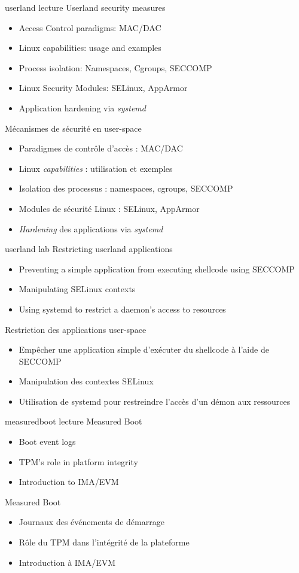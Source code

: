 {userland}
{lecture}
{Userland security measures}
{
  \begin{itemize}
  \item Access Control paradigms: MAC/DAC
  \item Linux capabilities: usage and examples
  \item Process isolation: Namespaces, Cgroups, SECCOMP
  \item Linux Security Modules: SELinux, AppArmor
  \item Application hardening via {\em systemd}
  \end{itemize}
}
{Mécanismes de sécurité en user-space}
{
  \begin{itemize}
  \item Paradigmes de contrôle d’accès : MAC/DAC
  \item Linux {\em capabilities} : utilisation et exemples
  \item Isolation des processus : namespaces, cgroups, SECCOMP
  \item Modules de sécurité Linux : SELinux, AppArmor
  \item {\em Hardening} des applications via {\em systemd}
  \end{itemize}
}

{userland}
{lab}
{Restricting userland applications}
{
  \begin{itemize}
  \item Preventing a simple application from executing shellcode using SECCOMP
  \item Manipulating SELinux contexts
  \item Using systemd to restrict a daemon's access to resources
  \end{itemize}
}
{Restriction des applications user-space}
{
  \begin{itemize}
  \item Empêcher une application simple d’exécuter du shellcode à l’aide de SECCOMP
  \item Manipulation des contextes SELinux
  \item Utilisation de systemd pour restreindre l’accès d’un démon aux ressources
  \end{itemize}
}

{measuredboot}
{lecture}
{Measured Boot}
{
  \begin{itemize}
  \item Boot event logs
  \item TPM's role in platform integrity
  \item Introduction to IMA/EVM
  \end{itemize}
}
{Measured Boot}
{
  \begin{itemize}
  \item Journaux des événements de démarrage
  \item Rôle du TPM dans l’intégrité de la plateforme
  \item Introduction à IMA/EVM
  \end{itemize}
}

